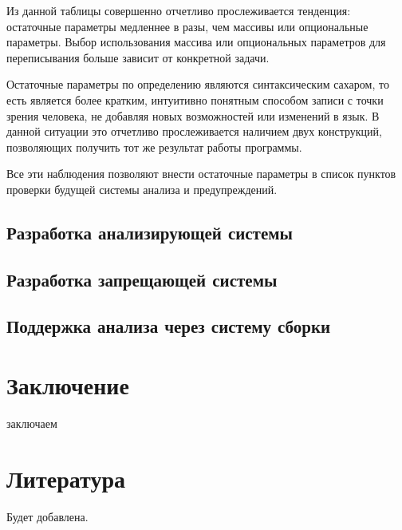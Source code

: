 \documentclass{mipt-thesis-bs}
\begin{document}
Из данной таблицы совершенно отчетливо прослеживается тенденция:
остаточные параметры медленнее в разы, чем массивы или опциональные параметры.
Выбор использования массива или опциональных параметров для переписывания больше
зависит от конкретной задачи.

Остаточные параметры по определению являются синтаксическим сахаром, то есть является
более кратким, интуитивно понятным способом записи с точки зрения человека, не добавляя
новых возможностей или изменений в язык. В данной ситуации это отчетливо прослеживается
наличием двух конструкций, позволяющих получить тот же результат работы программы.

Все эти наблюдения позволяют внести остаточные параметры в список пунктов проверки
будущей системы анализа и предупреждений.

\section{Разработка анализирующей системы}

\section{Разработка запрещающей системы}

\section{Поддержка анализа через систему сборки}
\chapter{Заключение}
заключаем

\backmatter


\chapter{Литература}

Будет добавлена.
\end{document}
